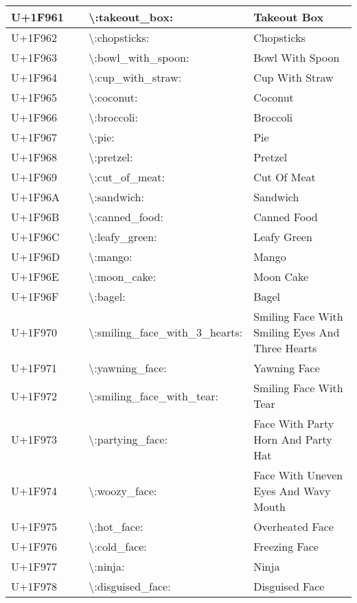 \begin{table}[h]
\begin{tabulary}{\linewidth}{|L|L|L|L|}
\hline
U+1F961 & 🥡 & {\textbackslash}:takeout\_box: & Takeout Box \\
\hline
U+1F962 & 🥢 & {\textbackslash}:chopsticks: & Chopsticks \\
\hline
U+1F963 & 🥣 & {\textbackslash}:bowl\_with\_spoon: & Bowl With Spoon \\
\hline
U+1F964 & 🥤 & {\textbackslash}:cup\_with\_straw: & Cup With Straw \\
\hline
U+1F965 & 🥥 & {\textbackslash}:coconut: & Coconut \\
\hline
U+1F966 & 🥦 & {\textbackslash}:broccoli: & Broccoli \\
\hline
U+1F967 & 🥧 & {\textbackslash}:pie: & Pie \\
\hline
U+1F968 & 🥨 & {\textbackslash}:pretzel: & Pretzel \\
\hline
U+1F969 & 🥩 & {\textbackslash}:cut\_of\_meat: & Cut Of Meat \\
\hline
U+1F96A & 🥪 & {\textbackslash}:sandwich: & Sandwich \\
\hline
U+1F96B & 🥫 & {\textbackslash}:canned\_food: & Canned Food \\
\hline
U+1F96C & 🥬 & {\textbackslash}:leafy\_green: & Leafy Green \\
\hline
U+1F96D & 🥭 & {\textbackslash}:mango: & Mango \\
\hline
U+1F96E & 🥮 & {\textbackslash}:moon\_cake: & Moon Cake \\
\hline
U+1F96F & 🥯 & {\textbackslash}:bagel: & Bagel \\
\hline
U+1F970 & 🥰 & {\textbackslash}:smiling\_face\_with\_3\_hearts: & Smiling Face With Smiling Eyes And Three Hearts \\
\hline
U+1F971 & 🥱 & {\textbackslash}:yawning\_face: & Yawning Face \\
\hline
U+1F972 & 🥲 & {\textbackslash}:smiling\_face\_with\_tear: & Smiling Face With Tear \\
\hline
U+1F973 & 🥳 & {\textbackslash}:partying\_face: & Face With Party Horn And Party Hat \\
\hline
U+1F974 & 🥴 & {\textbackslash}:woozy\_face: & Face With Uneven Eyes And Wavy Mouth \\
\hline
U+1F975 & 🥵 & {\textbackslash}:hot\_face: & Overheated Face \\
\hline
U+1F976 & 🥶 & {\textbackslash}:cold\_face: & Freezing Face \\
\hline
U+1F977 & 🥷 & {\textbackslash}:ninja: & Ninja \\
\hline
U+1F978 & 🥸 & {\textbackslash}:disguised\_face: & Disguised Face \\

\end{tabulary}
\end{table}
